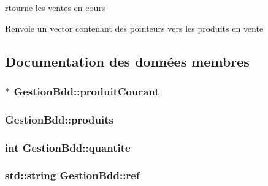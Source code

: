 rtourne les ventes en cours 

\begin{DoxyReturn}{Renvoie}
un vector contenant des pointeurs vers les produits en vente 
\end{DoxyReturn}


\subsection{Documentation des données membres}
\hypertarget{class_gestion_bdd_a892f50933d1226a389b561276bd0ca93}{
\subsubsection[{produit\-Courant}]{$\ast$ Gestion\-Bdd\-::produit\-Courant\hspace{0.3cm}{\ttfamily [protected]}}}\label{class_gestion_bdd_a892f50933d1226a389b561276bd0ca93}
\hypertarget{class_gestion_bdd_a3d8399948251d113edf841e5122c51b8}{
\subsubsection[{produits}]{ Gestion\-Bdd\-::produits\hspace{0.3cm}{\ttfamily [protected]}}}\label{class_gestion_bdd_a3d8399948251d113edf841e5122c51b8}
\hypertarget{class_gestion_bdd_aea2dfb9c9690c8aef62feb9936426588}{
\subsubsection[{quantite}]{\setlength{\rightskip}{0pt plus 5cm}int Gestion\-Bdd\-::quantite\hspace{0.3cm}{\ttfamily [protected]}}}\label{class_gestion_bdd_aea2dfb9c9690c8aef62feb9936426588}
\hypertarget{class_gestion_bdd_ae9e26a2043f3e10fb773107809bfc007}{
\subsubsection[{ref}]{\setlength{\rightskip}{0pt plus 5cm}std\-::string Gestion\-Bdd\-::ref\hspace{0.3cm}{\ttfamily [protected]}}}\label{class_gestion_bdd_ae9e26a2043f3e10fb773107809bfc007}
